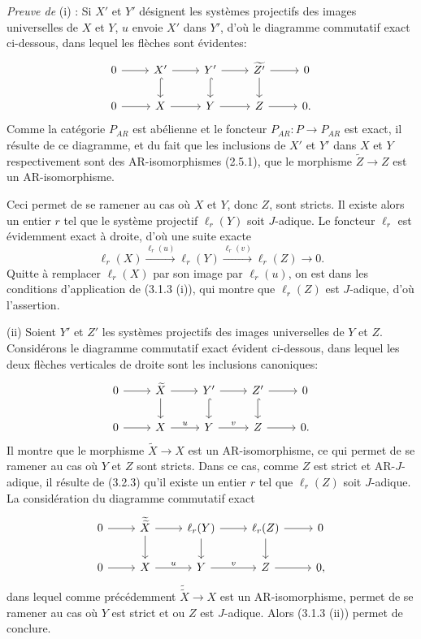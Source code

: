 \emph{Preuve de} (i) : Si $X'$ et $Y'$ désignent les systèmes projectifs des images universelles de $X$ et $Y$, $u$ envoie $X'$ dans $Y'$, d'où le diagramme commutatif exact ci-dessous, dans lequel les flèches sont évidentes:
\[
\begin{tikzcd}
0 \arrow[r] & X' \arrow[r] \arrow[d,hook] & Y' \arrow[r] \arrow[d,hook] & \widetilde{Z'} \arrow[r] \arrow[d] & 0\\
0 \arrow[r] & X \arrow[r] & Y \arrow[r] & Z \arrow[r] & 0 .
\end{tikzcd}
\]
Comme la catégorie $P_{AR}$ est abélienne et le foncteur 
$P_{AR}\colon P\to P_{AR}$ est
exact, il résulte de ce diagramme, et du fait que les inclusions de $X'$ et $Y'$ dans $X$ et $Y$ respectivement sont des AR-isomorphismes (2.5.1), que le morphisme $\widetilde Z\to Z$ est un AR-isomorphisme.

Ceci permet de se ramener au cas où $X$ et $Y$, donc $Z$, sont stricts. Il existe alors un entier $r$ tel que le système projectif $\ell_r(Y)$ soit $J$-adique. Le foncteur $\ell_r$ est évidemment exact à droite, d'où une suite exacte
\[
\ell_r(X)\stackrel{\ell_r(u)}{\longrightarrow}\ell_r(Y)\stackrel{\ell_r(v)}{\longrightarrow}\ell_r(Z)\longrightarrow0.
\]
Quitte à remplacer $\ell_r(X)$ par son image par $\ell_r(u)$, on est dans les conditions d'application de (3.1.3 (i)), qui montre que $\ell_r(Z)$ est $J$-adique, d'où l'assertion.

(ii) Soient $Y'$ et $Z'$ les systèmes projectifs des images universelles de $Y$ et $Z$. Considérons le diagramme commutatif exact évident ci-dessous, dans lequel les deux flèches verticales de droite sont les inclusions canoniques:
\[
\begin{tikzcd}
0 \arrow[r] & \widetilde X \arrow[r] \arrow[d] & Y' \arrow[r] \arrow[d,hook] & Z' \arrow[r] \arrow[d,hook] & 0\\
0 \arrow[r] & X \arrow[r,"u"] & Y \arrow[r,"v"] & Z \arrow[r] & 0 .
\end{tikzcd}
\]
Il montre que le morphisme $\widetilde X\to X$ est un AR-isomorphisme, ce qui permet de se ramener au cas où $Y$ et $Z$ sont stricts. Dans ce cas, comme $Z$ est strict et AR-$J$-adique, il résulte de (3.2.3) qu'il existe un entier $r$ tel que $\ell_r(Z)$ soit $J$-adique. La considération du diagramme commutatif exact
\[
\begin{tikzcd}
0 \arrow[r] & \widetilde{\widetilde X} \arrow[r] \arrow[d] & \ell_r(Y) \arrow[r] \arrow[d] & \ell_r(Z) \arrow[r] \arrow[d] & 0\\
0 \arrow[r] & X \arrow[r,"u"] & Y \arrow[r,"v"] & Z \arrow[r] & 0,
\end{tikzcd}
\]
dans lequel comme précédemment $\widetilde{\widetilde X}\to X$ est un AR-isomorphisme, permet de se ramener au cas où $Y$ est strict et ou $Z$ est $J$-adique. Alors 
(3.1.3 (ii))
permet de conclure.

